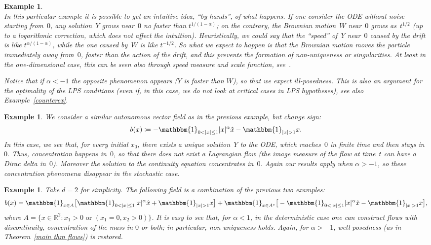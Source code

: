 \documentclass[a4paper,10pt]{article}
\newtheorem{example}[theorem]{Example}
\newcommand\1{\mathbbm{1}}
\numberwithin{equation}{section}
\begin{document}
\begin{example}
\begin{minipage}{0.97\linewidth}
\end{minipage}
\\[0.1cm]

In this particular example it is possible to get an intuitive idea, ``by hands'', of what happens. If one consider the ODE without noise starting from~$0$, any solution~$Y$ grows near~$0$ no faster than $t^{1/(1-\alpha)}$; on the contrary, the Brownian motion~$W$ near~$0$ grows as~$t^{1/2}$ \textup{(}up to a logarithmic correction, which does not affect the intuition\textup{)}. Heuristically, we could say that the ``speed'' of~$Y$ near~$0$ caused by the drift is like  $t^{\alpha/(1-\alpha)}$, while the one caused by~$W$ is like $t^{-1/2}$. So what we expect to happen is that the Brownian motion moves the particle immediately away from~$0$, faster than the action of the drift, and this prevents the formation of non-uniqueness or singularities. At least in the one-dimensional case, this can be seen also through speed measure and scale function, see~\textup{\cite{BREIMAN}}.

Notice that if $\alpha<-1$ the opposite phenomenon appears \textup{(}$Y$ is faster than $W$\textup{)}, so that we expect ill-posedness. This is also an argument for the optimality of the LPS conditions \textup{(}even if, in this case, we do not look at critical cases in LPS hypotheses\textup{)}, see also Example~\ref{counterex}.
\end{example}

\begin{example}
We consider a similar autonomous vector field as in the previous example, but change sign:
\begin{equation*}
b(x)\coloneqq - \1_{0<|x|\le1}|x|^{\alpha}\hat{x}- \1_{|x|>1}x.
\end{equation*}
In this case, we see that, for every initial $x_0$, there exists a unique solution~$Y$ to the ODE, which reaches~$0$ in finite time and then stays in~$0$. Thus, concentration happens in~$0$, so that there does not exist a Lagrangian flow \textup{(}the image measure of the flow at time~$t$ can have a Dirac delta in~$0$\textup{)}. Moreover the solution to the continuity equation concentrates in~$0$. Again our results apply when $\alpha>-1$, so these concentration phenomena disappear in the stochastic case.
\end{example}

\begin{example}
Take $d=2$ for simplicity. The following field is a combination of the previous two examples:
\begin{equation*}
b(x)= \1_{x\in A} \big[ \1_{0<|x|\le1}|x|^{\alpha}\hat{x}+ \1_{|x|>1}x \big]+ \1_{x\in A^c} \big[- \1_{0<|x|\le1}|x|^{\alpha}\hat{x}- \1_{|x|>1}x\big],
\end{equation*}
where $A=\{x\in\mathbb{R}^2 \colon x_1>0\mbox{ or }(x_1=0,x_2>0)\}$. It is easy to see that, for $\alpha<1$, in the deterministic case one can construct flows with discontinuity, concentration of the mass in $0$ or both; in particular, non-uniqueness holds. Again, for $\alpha>-1$, well-posedness \textup{(}as in Theorem~\ref{main thm flows}\textup{)} is restored.
\end{example}
\end{document}
